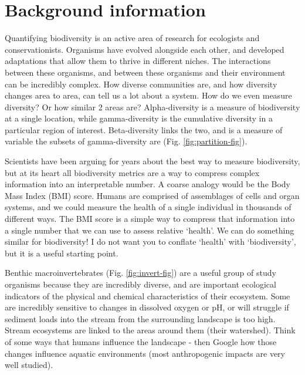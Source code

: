 \documentclass[]{book}
\begin{document}
\hypertarget{background-information-3}{%
\section{Background information}\label{background-information-3}}

Quantifying biodiversity is an active area of research for ecologists and conservationists. Organisms have evolved alongside each other, and developed adaptations that allow them to thrive in different niches. The interactions between these organisms, and between these organisms and their environment can be incredibly complex. How diverse communities are, and how diversity changes area to area, can tell us a lot about a system. How do we even measure diversity? Or how similar 2 areas are? Alpha-diversity is a measure of biodiversity at a single location, while gamma-diversity is the cumulative diversity in a particular region of interest. Beta-diversity links the two, and is a measure of variable the subsets of gamma-diversity are (Fig. \ref{fig:partition-fig}).

Scientists have been arguing for years about the best way to measure biodiversity, but at its heart all biodiversity metrics are a way to compress complex information into an interpretable number. A coarse analogy would be the Body Mass Index (BMI) score. Humans are comprised of assemblages of cells and organ systems, and we could measure the health of a single individual in thousands of different ways. The BMI score is a simple way to compress that information into a single number that we can use to assess relative `health'. We can do something similar for biodiversity! I do not want you to conflate `health' with `biodiversity', but it is a useful starting point.

Benthic macroinvertebrates (Fig. \ref{fig:invert-fig}) are a useful group of study organisms because they are incredibly diverse, and are important ecological indicators of the physical and chemical characteristics of their ecosystem. Some are incredibly sensitive to changes in dissolved oxygen or pH, or will struggle if sediment loads into the stream from the surrounding landscape is too high. Stream ecosystems are linked to the areas around them (their watershed). Think of some ways that humans influence the landscape - then Google how those changes influence aquatic environments (most anthropogenic impacts are very well studied).
\end{document}
